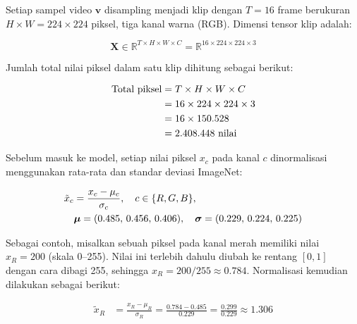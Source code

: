 Setiap sampel video $\mathbf{v}$ disampling menjadi klip dengan
$T=16$ frame berukuran $H\times W = 224\times 224$ piksel, tiga kanal
warna (RGB). Dimensi tensor klip adalah:
 
\vspace{0.5cm}
\begin{equation}
  \mathbf{X} \in \mathbb{R}^{T \times H \times W \times C}
  = \mathbb{R}^{16 \times 224 \times 224 \times 3}
\end{equation}
\vspace{0.5cm}
 
\noindent
Jumlah total nilai piksel dalam satu klip dihitung sebagai berikut:
 
\vspace{0.5cm}
\begin{align}
  \text{Total piksel}
  &= T \times H \times W \times C \notag \\
  &= 16 \times 224 \times 224 \times 3 \notag \\
  &= 16 \times 150{.}528 \notag \\
  &= 2{.}408{.}448 \text{ nilai}
\end{align}
\vspace{0.5cm}
 
\noindent
Sebelum masuk ke model, setiap nilai piksel $x_c$ pada kanal $c$
dinormalisasi menggunakan rata-rata dan standar deviasi ImageNet:
 
\vspace{0.5cm}
\begin{align}
  \tilde{x}_{c} &= \frac{x_{c} - \mu_{c}}{\sigma_{c}},
  \quad c \in \{R,G,B\}, \notag \\
  &\boldsymbol{\mu}=(0.485,\,0.456,\,0.406),
  \quad \boldsymbol{\sigma}=(0.229,\,0.224,\,0.225)
\end{align}
\vspace{0.5cm}
 
\noindent
Sebagai contoh, misalkan sebuah piksel pada kanal merah memiliki nilai
$x_R = 200$ (skala 0--255). Nilai ini terlebih dahulu diubah ke rentang
$[0,1]$ dengan cara dibagi 255, sehingga $x_R = 200/255 \approx 0.784$.
Normalisasi kemudian dilakukan sebagai berikut:
 
\vspace{0.5cm}
\begin{align*}
  \tilde{x}_R
  &= \frac{x_R - \mu_R}{\sigma_R}
   = \frac{0.784 - 0.485}{0.229}
   = \frac{0.299}{0.229}
   \approx 1.306
\end{align*}
\vspace{0.5cm}
 
